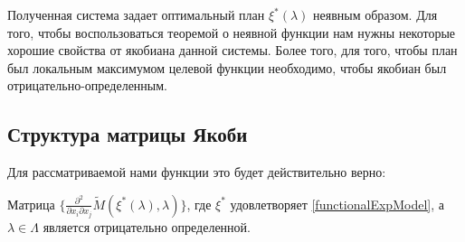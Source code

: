 Полученная система задает оптимальный план $\xi^{*}(\lambda)$ неявным образом. Для того, чтобы воспользоваться теоремой о неявной функции нам нужны некоторые хорошие свойства от якобиана данной системы. Более того, для того, чтобы план был локальным максимумом целевой функции необходимо, чтобы  
якобиан был отрицательно-определенным. 
\subsection{Структура матрицы Якоби}
Для рассматриваемой нами функции это будет действительно верно:
\begin{thm}
Матрица $\{ \frac{\partial^2}{\partial x_i \partial x_j} \tilde{M}(\xi^{*}(\lambda), \lambda)\}$, где $\xi^{*}$ удовлетворяет \eqref{functionalExpModel}, а  $\lambda \in \Lambda$ является отрицательно определенной.
\end{thm}

